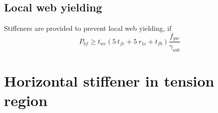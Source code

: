 \documentclass[11.5pt,a4paper,oneside]{report}
\begin{document}
\begin{Form}
\subsection{Local web yielding}
Stiffeners are provided to prevent local web yielding, 
if
\begin{equation}
	P_{bf} \geq  t_{wc}(5~t_{fc} + 5~r_{1c} + t_{fb}) \frac{f_{yw}}{\gamma_{m0}}
\end{equation}






\section{Horizontal stiffener in tension region}
\end{Form}
\end{document}
